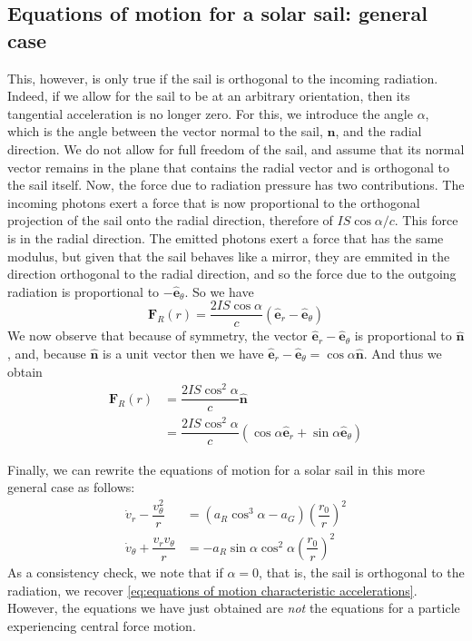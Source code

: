\documentclass[twocolumn,12pt,a4paper]{article}
\numberwithin{equation}{section}
\begin{document}
\subsection{Equations of motion for a solar sail: general case}
This, however, is only true if the sail is orthogonal to the incoming radiation. Indeed, if we allow for the sail to be at an arbitrary orientation, then its tangential acceleration is no longer zero. For this, we introduce the angle \( \alpha \), which is the angle between the vector normal to the sail, \( \hat{\mathbf{n}} \), and the radial direction. We do not allow for full freedom of the sail, and assume that its normal vector remains in the plane that contains the radial vector and is orthogonal to the sail itself. Now, the force due to radiation pressure has two contributions. The incoming photons exert a force that is now proportional to the orthogonal projection of the sail onto the radial direction, therefore of \( IS\cos{\alpha}/c \). This force is in the radial direction. The emitted photons exert a force that has the same modulus, but given that the sail behaves like a mirror, they are emmited in the direction orthogonal to the radial direction, and so the force due to the outgoing radiation is proportional to \( {-\hat{\mathbf{e}}_{\theta}} \). So we have
\begin{equation}
  \mathbf{F}_R(r) = \dfrac{2IS \cos{\alpha}}{c} ( \hat{\mathbf{e}}_{r} - \hat{\mathbf{e}}_{\theta})
\end{equation}
We now observe that because of symmetry, the vector \( \hat{\mathbf{e}}_{r} - \hat{\mathbf{e}}_{\theta}  \) is proportional to \( \hat{\mathbf{n}} \), and, because \( \hat{\mathbf{n}} \) is a unit vector then we have \( \hat{\mathbf{e}}_{r} - \hat{\mathbf{e}}_{\theta} = \cos{\alpha} \hat{\mathbf{n}} \). 
And thus we obtain
\begin{align}
  \mathbf{F}_R(r) &= \dfrac{2IS \cos^2{\alpha}}{c} \hat{\mathbf{n}} \\
									&= \dfrac{2IS \cos^2{\alpha}}{c} (\cos{\alpha} \hat{\mathbf{e}}_r + \sin{\alpha} \hat{\mathbf{e}}_{\theta}) 
\end{align}

Finally, we can rewrite the equations of motion for a solar sail in this more general case as follows:
\begin{align} \label{eq:equations of motion general case}
  \dot{v}_r - \dfrac{v_{\theta}^2}{r} &= (a_R \cos^3{\alpha} - a_G) \left(\dfrac{r_0}{r}\right)^2 \\ 
  \dot{v}_{\theta} + \dfrac{v_r v_{\theta}}{r} &= -a_R	\sin{\alpha} \cos^2{\alpha} \left(\dfrac{r_0}{r}\right)^2
\end{align}
As a consistency check, we note that if \( \alpha = 0 \), that is, the sail is orthogonal to the radiation, we recover \autoref{eq:equations of motion characteristic accelerations}. However, the equations we have just obtained are \emph{not} the equations for a particle experiencing central force motion.   
\end{document}
